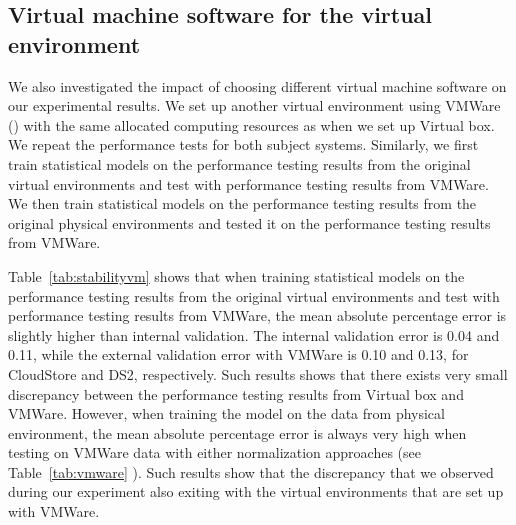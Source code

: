 






\subsection{Virtual machine software for the virtual environment}

We also investigated the impact of choosing different virtual machine software on our experimental results. We set up another virtual environment using VMWare () with the same allocated computing resources as when we set up Virtual box. We repeat the performance tests for both subject systems. Similarly, we first train statistical models on the performance testing results from the original virtual environments and test with performance testing results from VMWare. We then train statistical models on the performance testing results from the original physical environments and tested it on the performance testing results from VMWare. 

Table~\ref{tab:stabilityvm} shows that when training statistical models on the performance testing results from the original virtual environments and test with performance testing results from VMWare, the mean absolute percentage error is slightly higher than internal validation. The internal validation error is 0.04 and 0.11, while the external validation error with VMWare is 0.10 and 0.13, for CloudStore and DS2, respectively. Such results shows that there exists very small discrepancy between the performance testing results from Virtual box and VMWare. However, when training the model on the data from physical environment, the mean absolute percentage error is always very high when testing on VMWare data with either normalization approaches (see Table~\ref{tab:vmware} ). Such results show that the discrepancy that we observed during our experiment also exiting with the virtual environments that are set up with VMWare.

